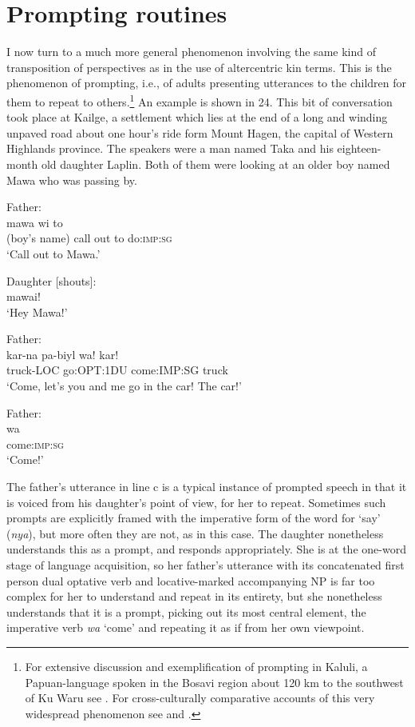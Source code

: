\documentclass[output=paper]{langsci/langscibook}
\begin{document}
\section{Prompting routines}\label{s:ar5}

I now turn to a much more general phenomenon involving the same kind of transposition of perspectives as in the use of altercentric kin terms. This is the phenomenon of prompting, i.e., of adults presenting utterances to the children for them to repeat to others.\footnote{For extensive discussion and exemplification of prompting in Kaluli, a Papuan-language spoken in the Bosavi region about 120 km to the southwest of Ku Waru see \cite{Schieffelin1991}. For cross-culturally comparative accounts of this very widespread phenomenon see \cite{Demuth1986} and \cite{Moore2012}.} An example is shown in 24. This bit of conversation took place at Kailge, a settlement which lies at the end of a long and winding unpaved road about one hour’s ride form Mount Hagen, the capital of Western Highlands province. The speakers were a man named Taka and his eighteen-month old daughter Laplin. Both of them were looking at an older boy named Mawa who was passing by.

\begin{exe}
	\ex \label{ex:ar24}
	\begin{xlist}
	\ex Father:\label{ex:ar24a}\\
	\gll mawa wi to\\
	(boy’s name) call out to do:\textsc{imp}:\textsc{sg}\\
	\trans ‘Call out to Mawa.’ 	
	
	\ex Daughter [shouts]:\label{ex:ar24b}\\
	mawai!\\
	\trans ‘Hey Mawa!’
	
	\ex Father:\label{ex:ar24c}\\
	\gll kar-na pa-biyl wa! kar!\\
	truck-LOC go:OPT:1DU come:IMP:SG truck\\
	\trans ‘Come, let’s you and me go in the car! The car!’
	
	\ex Father:\label{ex:ar24d}\\
	\gll wa\\
	come:\textsc{imp}:\textsc{sg}\\
	\trans ‘Come!’
	\end{xlist}
\end{exe}

The father’s utterance in line c is a typical instance of prompted speech in that it is voiced from his daughter’s point of view, for her to repeat. Sometimes such prompts are explicitly framed with the imperative form of the word for ‘say’ (\textit{nya}), but more often they are not, as in this case. The daughter nonetheless understands this as a prompt, and responds appropriately. She is at the one-word stage of language acquisition, so her father’s utterance with its concatenated first person dual optative verb and locative-marked accompanying NP is far too complex for her to understand and repeat in its entirety, but she nonetheless understands that it is a prompt, picking out its most central element, the imperative verb \textit{wa} ‘come’ and repeating it as if from her own viewpoint.
\end{document}
